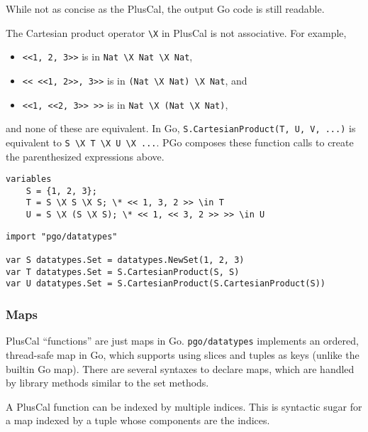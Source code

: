 While not as concise as the PlusCal, the output Go code is still readable.

The Cartesian product operator \verb|\X| in PlusCal is not associative. For example,
\begin{itemize}
\item \texttt{<<1, 2, 3>>} is in \verb|Nat \X Nat \X Nat|,

\item \texttt{<< <<1, 2>>, 3>>} is in \verb|(Nat \X Nat) \X Nat|, and

\item \texttt{<<1, <<2, 3>> >>} is in \verb|Nat \X (Nat \X Nat)|,
\end{itemize}
and none of these are equivalent. In Go, \texttt{S.CartesianProduct(T, U, V, ...)} is equivalent to \verb|S \X T \X U \X ...|. PGo composes these function calls to create the parenthesized expressions above.

\noindent
\begin{minipage}[t]{\textwidth}
\begin{lstlisting}[language=pcal]
variables
	S = {1, 2, 3};
	T = S \X S \X S; \* << 1, 3, 2 >> \in T
	U = S \X (S \X S); \* << 1, << 3, 2 >> >> \in U
\end{lstlisting}
\end{minipage}

\noindent
\begin{minipage}[t]{\textwidth}
\begin{lstlisting}[language=golang]
import "pgo/datatypes"

var S datatypes.Set = datatypes.NewSet(1, 2, 3)
var T datatypes.Set = S.CartesianProduct(S, S)
var U datatypes.Set = S.CartesianProduct(S.CartesianProduct(S))
\end{lstlisting}
\end{minipage}

\subsubsection{Maps}
PlusCal ``functions'' are just maps in Go. \texttt{pgo/datatypes} implements an ordered, thread-safe map in Go, which supports using slices and tuples as keys (unlike the builtin Go map). There are several syntaxes to declare maps, which are handled by library methods similar to the set methods.

A PlusCal function can be indexed by multiple indices. This is syntactic sugar for a map indexed by a tuple whose components are the indices.

